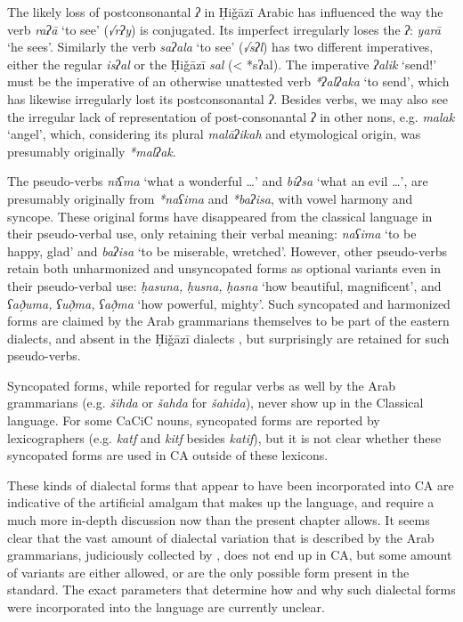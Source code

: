 \documentclass[output=paper]{langsci/langscibook}
\begin{document}
The likely loss of postconsonantal \textit{ʔ} in Ḥiǧāzī Arabic has influenced the way the verb \textit{raʔā} ‘to see’ (\textit{√rʔy}) is conjugated. Its imperfect irregularly loses the \textit{ʔ}: \textit{yarā} ‘he sees’. Similarly the verb \textit{saʔala} ‘to see’ (\textit{√sʔl}) has two different imperatives, either the regular \textit{isʔal} or the Ḥiǧāzī \textit{sal} (< *sʔal). The imperative \textit{ʔalik} ‘send!’ must be the imperative of an otherwise unattested verb \textit{*ʔalʔaka} ‘to send’, which has likewise irregularly lost its postconsonantal \textit{ʔ}. Besides verbs, we may also see the irregular lack of representation of post-consonantal \textit{ʔ} in other nons, e.g. \textit{malak} ‘angel’, which, considering its plural \textit{malāʔikah} and etymological origin, was presumably originally \textit{*malʔak}.

The pseudo-verbs \textit{niʕma} ‘what a wonderful …’ and \textit{biʔsa} ‘what an evil …’, are presumably originally from \textit{*naʕima} and \textit{*baʔisa}, with vowel harmony and syncope. These original forms have disappeared from the classical language in their pseudo-verbal use, only retaining their verbal meaning: \textit{naʕima} ‘to be happy, glad’ and \textit{baʔisa} ‘to be miserable, wretched’. However, other pseudo-verbs retain both unharmonized and unsyncopated forms as optional variants even in their pseudo-verbal use: \textit{ḥasuna,} \textit{ḥusna,} \textit{ḥasna} ‘how beautiful, magnificent’, and \textit{ʕað̣uma,} \textit{ʕuð̣ma,} \textit{ʕað̣ma} ‘how powerful, mighty’. Such syncopated and harmonized forms are claimed by the Arab grammarians themselves to be part of the eastern dialects, and absent in the Ḥiǧāzī dialects \citep[97]{Rabin1951}, but surprisingly are retained for such pseudo-verbs.

Syncopated forms, while reported for regular verbs as well by the Arab grammarians (e.g. \textit{šihda} or \textit{šahda} for \textit{šahida}), never show up in the Classical language. For some CaCiC nouns, syncopated forms are reported by lexicographers (e.g. \textit{katf} and \textit{kitf} besides \textit{katif}), but it is not clear whether these syncopated forms are used in CA outside of these lexicons.

These kinds of dialectal forms that appear to have been incorporated into CA are indicative of the artificial amalgam that makes up the language, and require a much more in-depth discussion now than the present chapter allows. It seems clear that the vast amount of dialectal variation that is described by the Arab grammarians, judiciously collected by \citet{Rabin1951}, does not end up in CA, but some amount of variants are either allowed, or are the only possible form present in the standard. The exact parameters that determine how and why such dialectal forms were incorporated into the language are currently unclear.
\end{document}
